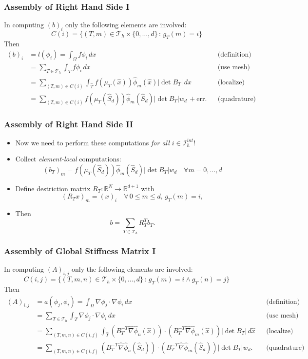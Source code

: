 \documentclass[ignorenonframetext,11pt]{beamer}
\theoremstyle{definition}
\begin{document}
\begin{frame}
\frametitle{Assembly of Right Hand Side I}
In computing $(b)_i$ only the following elements are involved:
$$C(i) = \{(T,m)\in\mathcal{T}_h\times\{0,\ldots,d\} \,:\, g_T(m)=i\}$$
Then
\begin{align*}
(b)_i &= l(\phi_i) = \int_\Omega f \phi_i\,dx &&\text{(definition)} \\
&= \sum_{T\in\mathcal{T}_h} \int_T f \phi_i\,dx &&\text{(use mesh)} \\
&= \sum_{(T,m)\in C(i)} \int_{\hat T} f(\mu_T(\hat x)) \hat\phi_m(\hat x) |\det B_T|\,dx 
&&\text{(localize)} \\
&= \sum_{(T,m)\in C(i)} 
f(\mu_T(\hat S_d)) \hat\phi_m(\hat S_d) |\det B_T| w_d \, + \text{err}. &&\text{(quadrature)} 
\end{align*}
\end{frame}

\begin{frame}
\frametitle{Assembly of Right Hand Side II}
\begin{itemize}
\item Now we need to perform these computations {\em for all $i\in\mathcal{I}_h^{int}$}!
\item Collect {\em element-local} computations:
\begin{equation*}
(b_T)_m =  f(\mu_T(\hat S_d)) \hat\phi_m(\hat S_d) |\det B_T| w_d \quad \forall m=0,\ldots,d 
\end{equation*}
\item Define {destriction matrix} $R_T : \mathbb{R}^N \to \mathbb{R}^{d+1}$ with
\begin{equation*}
(R_T x)_m = (x)_i \quad \forall \,0\leq m \leq d, \,g_T(m)=i,
\end{equation*}
\item Then
\begin{equation*}
b = \sum_{T\in\mathcal{T}_h} R_T^T b_T .
\end{equation*}
\end{itemize}
\end{frame}

\begin{frame}
\frametitle{Assembly of Global Stiffness Matrix I}
In computing $(A)_{i,j}$ only the following elements are involved:
$$C(i,j) = \{(T,m,n)\in\mathcal{T}_h\times\{0,\ldots,d\} \,:\, g_T(m)=i \wedge g_T(n)=j\}$$
Then
{\small\begin{align*}
(A)_{i,j} &= a(\phi_j,\phi_i) = \int_\Omega \nabla \phi_j \cdot \nabla \phi_i \,dx 
&&\text{(definition)}\\
&= \sum_{T\in\mathcal{T}_h} \int_T \nabla \phi_j \cdot \nabla \phi_i \,dx
&&\text{(use mesh)}\\
&= \sum_{(T,m,n)\in C(i,j)}
\int_{\hat T} (B_T^{-T} \hat\nabla\hat\phi_n(\hat x))\cdot (B_T^{-T} \hat\nabla\hat\phi_m(\hat x))
|\det B_T| \,d\hat x &&\text{(localize)}\\
&= \sum_{(T,m,n)\in C(i,j)}
(B_T^{-T} \hat\nabla\hat\phi_n(\hat S_d))\cdot (B_T^{-T} \hat\nabla\hat\phi_m(\hat S_d))
|\det B_T| w_d . &&\text{(quadrature)}
\end{align*}}
\end{frame}
\end{document}

